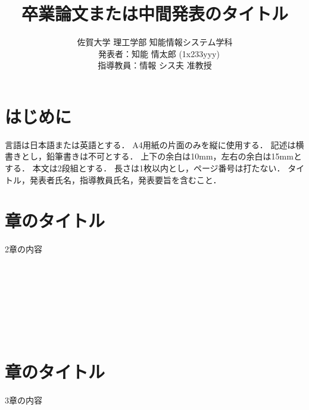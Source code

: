 ﻿\documentclass[twocolumn,a4j]{jarticle}
\title{
  卒業論文または中間発表のタイトル
}
\author{
  佐賀大学 理工学部 知能情報システム学科\\
  　発表者：知能 情太郎 (1x233yyy)\\
  指導教員：情報 シス夫 准教授
}
\begin{document}
\date{\empty}
\maketitle
\thispagestyle{empty}

\section{はじめに }

言語は日本語または英語とする．
A4用紙の片面のみを縦に使用する．
記述は横書きとし，鉛筆書きは不可とする．
上下の余白は10mm，左右の余白は15mmとする．
本文は2段組とする．
長さは1枚以内とし，ページ番号は打たない．
タイトル，発表者氏名，指導教員氏名，発表要旨を含むこと．



\section{章のタイトル}
2章の内容
\\
\\
\\
\\
\\
\\
\\
\\


\section{章のタイトル}
3章の内容
\\
\\
\\
\\
\\
\\
\\
\\
\end{document}
